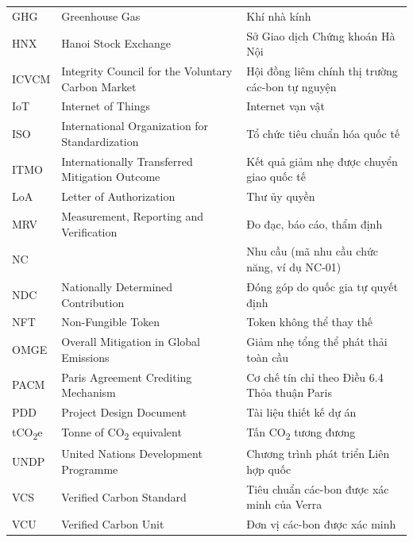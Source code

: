 \documentclass[a4paper,oneside]{report}
\numberwithin{equation}{chapter}
\begin{document}
\begin{longtable}{@{}p{2.4cm}p{5.4cm}p{6.3cm}@{}}
GHG    & Greenhouse Gas                            & Khí nhà kính \\
HNX    & Hanoi Stock Exchange                      & Sở Giao dịch Chứng khoán Hà Nội \\
ICVCM  & Integrity Council for the Voluntary Carbon Market & Hội đồng liêm chính thị trường các-bon tự nguyện \\
IoT    & Internet of Things                        & Internet vạn vật \\
ISO    & International Organization for Standardization & Tổ chức tiêu chuẩn hóa quốc tế \\
ITMO   & Internationally Transferred Mitigation Outcome & Kết quả giảm nhẹ được chuyển giao quốc tế \\
LoA    & Letter of Authorization                   & Thư ủy quyền \\
MRV    & Measurement, Reporting and Verification   & Đo đạc, báo cáo, thẩm định \\
NC     &                                           & Nhu cầu (mã nhu cầu chức năng, ví dụ NC-01) \\
NDC    & Nationally Determined Contribution        & Đóng góp do quốc gia tự quyết định \\
NFT    & Non-Fungible Token                        & Token không thể thay thế \\
OMGE   & Overall Mitigation in Global Emissions    & Giảm nhẹ tổng thể phát thải toàn cầu \\
PACM   & Paris Agreement Crediting Mechanism       & Cơ chế tín chỉ theo Điều 6.4 Thỏa thuận Paris \\
PDD    & Project Design Document                   & Tài liệu thiết kế dự án \\
tCO\textsubscript{2}e & Tonne of CO\textsubscript{2} equivalent & Tấn CO\textsubscript{2} tương đương \\
UNDP   & United Nations Development Programme      & Chương trình phát triển Liên hợp quốc \\
VCS    & Verified Carbon Standard                  & Tiêu chuẩn các-bon được xác minh của Verra \\
VCU    & Verified Carbon Unit                      & Đơn vị các-bon được xác minh \\

\end{longtable}
\end{document}
